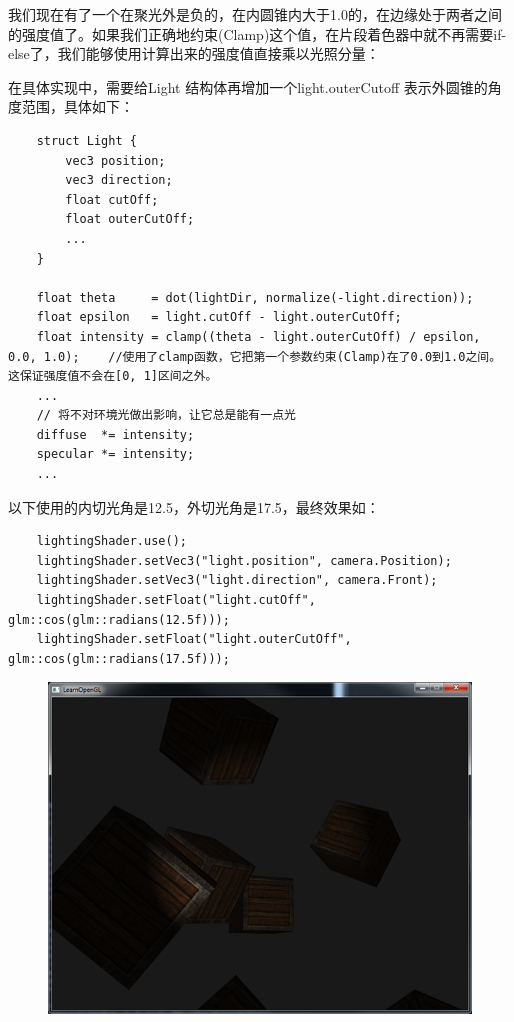 \documentclass[UTF8,a4paper,12pt]{ctexbook}
\begin{document}
				我们现在有了一个在聚光外是负的，在内圆锥内大于1.0的，在边缘处于两者之间的强度值了。如果我们正确地约束(Clamp)这个值，在片段着色器中就不再需要if-else了，我们能够使用计算出来的强度值直接乘以光照分量：
				
				在具体实现中，需要给Light 结构体再增加一个light.outerCutoff 表示外圆锥的角度范围，具体如下：
				
				\begin{lstlisting}
	struct Light {
	    vec3 position;  
	    vec3 direction;
	    float cutOff;
	    float outerCutOff;	
	    ...
	}		
				
	float theta     = dot(lightDir, normalize(-light.direction));
	float epsilon   = light.cutOff - light.outerCutOff;
	float intensity = clamp((theta - light.outerCutOff) / epsilon, 0.0, 1.0);    //使用了clamp函数，它把第一个参数约束(Clamp)在了0.0到1.0之间。这保证强度值不会在[0, 1]区间之外。
	...
	// 将不对环境光做出影响，让它总是能有一点光
	diffuse  *= intensity;
	specular *= intensity;
	...			
				\end{lstlisting}
				
				
				以下使用的内切光角是12.5，外切光角是17.5，最终效果如：
				\begin{lstlisting}
	lightingShader.use();
	lightingShader.setVec3("light.position", camera.Position);
	lightingShader.setVec3("light.direction", camera.Front);
	lightingShader.setFloat("light.cutOff", glm::cos(glm::radians(12.5f)));
	lightingShader.setFloat("light.outerCutOff", glm::cos(glm::radians(17.5f)));					
				\end{lstlisting}
				
				\begin{figure}[H]
					\centering
					\includegraphics[width=.79\linewidth]{light_casters_spotlight}
				\end{figure}
			
\end{document}
